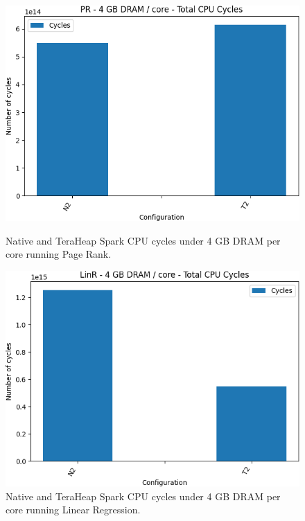 \begin{figure}[thbp]
        \centering
        \includegraphics[width=\linewidth]{./fig/pr32_cycles.png}
    \caption{Native and TeraHeap Spark CPU cycles under 4 GB DRAM per core running Page Rank.}
\label{fig:pr32_cycles}
        \includegraphics[width=\linewidth]{./fig/linr32_cycles.png}
    \caption{Native and TeraHeap Spark CPU cycles under 4 GB DRAM per core running Linear Regression.}
                \label{fig:linr32_cycles}
\end{figure}

